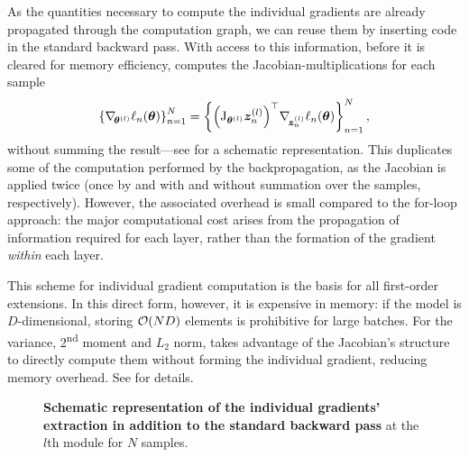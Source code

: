 As the quantities necessary to compute the individual gradients are already
propagated through the computation graph, we can reuse them by inserting code in
the standard backward pass. With access to this information, before it is
cleared for memory efficiency, \BackPACK%
computes the Jacobian-multiplications
for each sample
\begin{equation}
  {\left\{
      \ensuremath{\nabla_{\!{{\bm{\theta}}^{(l)}}}} \ell_n({\bm{\theta}})
    \right\}}_{n=1}^N
  =
  {\left\{
      {\left(\mathrm{J}_{{\bm{\theta}}^{(l)}} {\bm{z}}^{(l)}_n\right)}^\top \nabla_{\!{{\bm{z}}_n^{(l)}}} \ell_n({\bm{\theta}})
    \right\}}_{n=1}^N\,{,}
\end{equation}
without summing the result---see  for
a schematic representation. This duplicates some of the computation performed by
the backpropagation, as the Jacobian is applied twice (once by \PyTorch%
and \BackPACK%
with and without summation over the samples, respectively). However, the
associated overhead is small compared to the for-loop approach: the major
computational cost arises from the propagation of information required for each
layer, rather than the formation of the gradient \emph{within} each layer.

This scheme for individual gradient computation is the basis for all first-order
extensions. In this direct form, however, it is expensive in memory: if the
model is $D$-dimensional, storing ${\mathcal{O}}(ND)$ elements is prohibitive for large
batches. For the variance, 2\textsuperscript{nd} moment and $L_2$ norm,
\BackPACK%
takes advantage of the Jacobian's structure to directly compute them without
forming the individual gradient, reducing memory overhead. See
 for details.

\begin{figure}[!t]
  \centering
  \tikzexternalenable%
  
  \tikzexternaldisable%
  \caption{\textbf{Schematic representation of the individual gradients'
      extraction in addition to the standard backward pass} at the $l$th module
      for $N$ samples.}\label{backpack::fig:first-order-extraction}
\end{figure}

